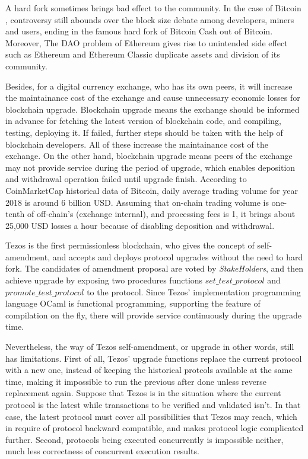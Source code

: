 \documentclass[sigplan,screen]{acmart}
\begin{document}
A hard fork sometimes brings bad effect to the community.
In the case of Bitcoin \cite{bitcoin}, controversy still abounds over the block
size debate among developers, miners and users, ending in the famous hard fork
of Bitcoin Cash \cite{bitcoincash} out of Bitcoin.
Moreover, The DAO problem \cite{thedaowikidef} of Ethereum \cite{ethereum}
gives rise to unintended side effect such as Ethereum and Ethereum Classic
\cite{ethereumclassic} duplicate assets and division of its community.

Besides, for a digital currency exchange, who has its own peers, it will
increase the maintainance cost of the exchange and cause unnecessary economic
losses for blockchain upgrade.
Blockchain upgrade means the exchange should be informed in
advance for fetching the latest version of blockchain code, and compiling,
testing, deploying it. If failed, further steps should be taken with the
help of blockchain developers. All of these increase the maintainance cost of
the exchange.
On the other hand, blockchain upgrade means peers of the exchange may not
provide service during the period of upgrade, which enables deposition and
withdrawal operation failed until upgrade finish.
According to CoinMarketCap \cite{coinmarketcap} historical data of Bitcoin,
daily average trading volume for year 2018 is around 6 billion USD.
Assuming that on-chain trading volume is one-tenth of off-chain's (exchange
internal), and processing fees is 1\textperthousand, it brings about 25,000 USD
losses a hour because of disabling deposition and withdrawal.

Tezos \cite{tezos} is the first permissionless blockchain, who gives
the concept of self-amendment, and accepts and deploys protocol upgrades
without the need to hard fork.
The candidates of amendment proposal are voted by \textit{StakeHolders}, and
then achieve upgrade by exposing two procedures functions
\cite{goodman2014tezos}
$set\_test\_protocol$ and $promote\_test\_protocol$ to the protocol.
Since Tezos' implementation programming language OCaml is functional
programming, supporting the feature of compilation on the fly, there will
provide service continuously during the upgrade time.

Nevertheless, the way of Tezos self-amendment, or upgrade in other words,
still has limitations.
First of all, Tezos' upgrade functions replace the current protocol
with a new one, instead of keeping the historical protcols available at the
same time, making it impossible to run the previous after done unless
reverse replacement again.
Suppose that Tezos is in the situation where the current protocol is the latest
while transactions to be verified and validated isn't. In that case, the latest
protocol must cover all possibilities that Tezos may reach, which in require of
protocol backward compatible, and makes protocol logic complicated further.
Second, protocols being executed concurrently is impossible neither, much less
correctness of concurrent execution results.
\end{document}

